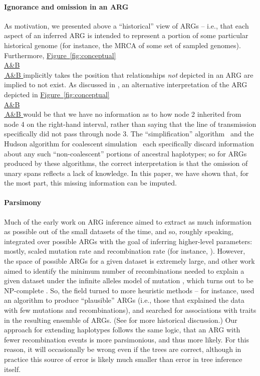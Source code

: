 \documentclass[10pt,twoside,lineno]{gsajnl}
\newcommand*{\figref}[2][]{%
	\hyperref[{#2}]{%
		Figure~\ref*{#2}%
		\ifx\\#1\\%
		\else
		\,#1%
		\fi
	}%
}
\begin{document}
\paragraph{Ignorance and omission in an ARG} 
As motivation, we presented above a ``historical'' view of ARGs --
i.e., that each aspect of an inferred ARG is intended to represent
a portion of some particular historical genome
(for instance, the MRCA of some set of sampled genomes).
Furthermore, \figref[A\&B]{fig:conceptual} implicitly takes the position
that relationships \emph{not} depicted in an ARG are implied to not exist.
As discussed in \citet{wong2024general},
an alternative interpretation
of the ARG depicted in \figref[A\&B]{fig:conceptual} would be that we have no information as to 
how node 2 inherited from node 4 on the right-hand interval,
rather than saying that the line of transmission specifically did not pass
through node 3.
The ``simplification'' algorithm~\citep{kelleher2018efficient}
and the Hudson algorithm for coalescent
simulation~\citep{hudson1983properties,kelleher2016efficient}
each specifically discard information about any such ``non-coalescent'' portions of ancestral haplotypes;
so for ARGs produced by these algorithms, the correct interpretation is that
the omission of unary spans reflects a lack of knowledge.
In this paper, we have shown that, for the most part, this missing information can be imputed.

\paragraph{Parsimony}
Much of the early work on ARG inference aimed to extract as much information as possible
out of the small datasets of the time,
and so, roughly speaking, integrated over possible ARGs
with the goal of inferring higher-level parameters:
mostly, scaled mutation rate and recombination rate
(for instance, \citet{hudson1985statistical,griffiths1996ancestral,kuhner2000maximum,stephens2000inference,fearnhead2001estimating}).
However, the space of possible ARGs for a given dataset is extremely large,
and other work aimed to identify the minimum number of recombinations
needed to explain a given dataset under the infinite alleles model of mutation
\citep[e.g.,][]{hein1990reconstructing,myers2003bounds,song2005constructing},
which turns out to be NP-complete \citep{wang2001perfect}.
So, the field turned to more heuristic methods --
for instance, \citet{minichiello2006mapping}
used an algorithm to produce ``plausible'' ARGs
(i.e., those that explained the data with few mutations and recombinations),
and searched for associations with traits in the resulting ensemble of ARGs.
(See \citet{wong2024general} for more historical discussion.)
Our approach for extending haplotypes follows the same logic,
that an ARG with fewer recombination events is more parsimonious,
and thus more likely.
For this reason, it will occasionally be wrong even if the trees are correct,
although in practice this source of error is likely much smaller than error in tree inference itself.
\end{document}
